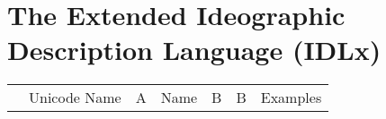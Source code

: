 


\vspace{\myLineheight}\begin{multicols}{2}\raggedcolumns{}\end{multicols}


\section{The Extended Ideographic Description Language (IDLx)
}


\vspace{\myLineheight}\begin{multicols}{2}\raggedcolumns{}\end{multicols}



\begin{tabular}[pos]{ | r | r | c | r | c | c | l | }
\hline
 & {\mktsStyleBold{}Unicode Name} & {\mktsStyleBold{}A} & {\mktsStyleBold{}Name} & {\mktsStyleBold{}B} & {\mktsStyleBold{}B} & {\mktsStyleBold{}Examples}\\


\end{tabular}
